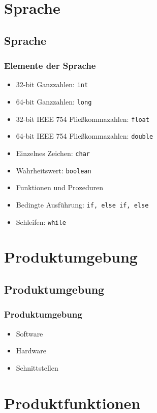 \documentclass{beamer}
\begin{document}
\section{Sprache}
\subsection{Sprache}
\begin{frame}
\frametitle{Elemente der Sprache}
\begin{itemize}
\item  32-bit Ganzzahlen: \texttt{int}
  \item  64-bit Ganzzahlen: \texttt{long}
 \item  32-bit IEEE 754 Fließkommazahlen: \texttt{float}
 \item   64-bit IEEE 754 Fließkommazahlen: \texttt{double}
  \item  Einzelnes Zeichen: \texttt{char}
  \item  Wahrheitswert: \texttt{boolean}
\item Funktionen und Prozeduren %
\item Bedingte Ausführung: \texttt{if, else if, else}
\item Schleifen: \texttt{while}
\end{itemize}
\end{frame}


\section{Produktumgebung}
\subsection{Produktumgebung}
\begin{frame}
\frametitle{Produktumgebung}
\begin{itemize}
\item Software
\item Hardware
\item Schnittstellen
\end{itemize}
\end{frame}


\section{Produktfunktionen}
\end{document}
